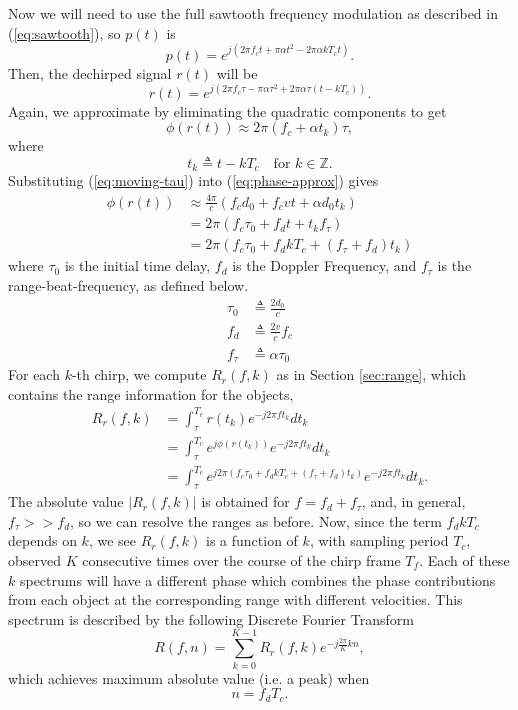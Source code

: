 Now we will need to use the full sawtooth frequency modulation as described in
(\ref{eq:sawtooth}), so $p(t)$ is
\begin{equation}
	p(t) = e^{j(2\pi f_c t+ \pi \alpha t^2 - 2\pi\alpha kT_c t)}.
\end{equation}
Then, the dechirped signal $r(t)$ will be
\begin{equation}
	r(t) = e^{j(2\pi f_c \tau - \pi \alpha \tau^2 + 2\pi\alpha\tau (t-kT_c))}.
\end{equation}
Again, we approximate by eliminating the quadratic components to get
\begin{equation}
	\phi (r(t)) \approx 2\pi (f_c + \alpha t_k)\tau,
	\label{eq:phase-approx}
\end{equation}
where 
\begin{equation}
	t_k \triangleq t - kT_c \quad \text{for }k\in\mathbb{Z}.
\end{equation}
Substituting (\ref{eq:moving-tau}) into (\ref{eq:phase-approx}) gives
\begin{align}
	\phi (r(t)) &\approx \frac{4\pi}{c}(f_c d_0 + f_c vt + \alpha d_0 t_k)\\
	&= 2\pi (f_c \tau_0 + f_d t + t_k f_{\tau})\\
	&= 2\pi (f_c \tau_0 + f_d k T_c + (f_{\tau} + f_d) t_k)
\end{align}
where $\tau_0$ is the initial time delay, $f_d$ is the Doppler Frequency, and
$f_{\tau}$ is the range-beat-frequency, as defined below.
\begin{align}
	\tau_0 &\triangleq \frac{2d_0}{c}\\
	f_d &\triangleq \frac{2v}{c} f_c\\
	f_{\tau} &\triangleq \alpha\tau_0
\end{align}
For each $k$-th chirp, we compute $R_r(f,k)$ as in Section \ref{sec:range}, which
contains the range information for the objects,
\begin{align}
	R_r(f,k) &= \int_{\tau}^{T_c} r(t_k)e^{-j2\pi f t_k}dt_k\\
	&= \int_{\tau}^{T_c} e^{j\phi(r(t_k))}e^{-j2\pi f t_k}dt_k\\
	&= \int_{\tau}^{T_c} e^{j2\pi (f_c \tau_0 + f_d k T_c + (f_{\tau} + f_d) t_k)}e^{-j2\pi f t_k}dt_k.
\end{align}
The absolute value $|R_r(f,k)|$ is obtained for $f = f_d + f_\tau$, and, in
general, $f_\tau >> f_d$, so we can resolve the ranges as before.
Now, since the term $f_dkT_c$ depends on $k$, we see $R_r(f,k)$ is a 
function of $k$, with sampling period $T_c$, observed $K$ consecutive times over the course of the chirp frame
$T_f$. Each of these $k$ spectrums will have a different phase which combines the
phase contributions from each object at the corresponding range with different
velocities. This spectrum is described by the following Discrete Fourier Transform
\begin{equation}
	\label{eq:velocity-dft}
	R(f, n) = \sum_{k=0}^{K-1}R_r(f, k) e^{-j\frac{2\pi}{K}kn},
\end{equation}
which achieves maximum absolute value (i.e. a peak) when 
\begin{equation}
	n = f_d T_c.
\end{equation}

